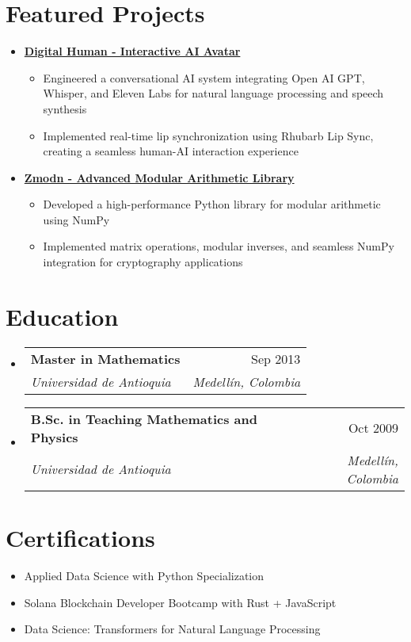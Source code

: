 \documentclass[letterpaper,11pt]{article}
\makeatletter
\newcommand{\resumeSubheading}[4]{
  \vspace{-2pt}
  \item[]
  \begin{tabular*}{\textwidth}{@{\extracolsep{\fill}}l r}
    \textbf{#1} & #2 \\
    \textit{#3} & \textit{#4} \\
  \end{tabular*}
  \vspace{-5pt}
}
\makeatother
\begin{document}
\section{Featured Projects}
\begin{itemize}[leftmargin=*]
    \item \textbf{\href{https://github.com/asanchezyali/talking-avatar-with-ai}{Digital Human - Interactive AI Avatar \faExternalLink}}
    \begin{itemize}
        \item Engineered a conversational AI system integrating Open AI GPT, Whisper, and Eleven Labs for natural language processing and speech synthesis
        \item Implemented real-time lip synchronization using Rhubarb Lip Sync, creating a seamless human-AI interaction experience
    \end{itemize}
    
    \item \textbf{\href{https://github.com/asanchezyali/zmodn}{Zmodn - Advanced Modular Arithmetic Library \faExternalLink}}
    \begin{itemize}
        \item Developed a high-performance Python library for modular arithmetic using NumPy
        \item Implemented matrix operations, modular inverses, and seamless NumPy integration for cryptography applications
    \end{itemize}
\end{itemize}

\section{Education}
\begin{itemize}[leftmargin=0pt, itemindent=0pt, label={}]
\resumeSubheading
{Master in Mathematics}{Sep 2013}
{Universidad de Antioquia}{Medellín, Colombia}

\resumeSubheading
{B.Sc. in Teaching Mathematics and Physics}{Oct 2009}
{Universidad de Antioquia}{Medellín, Colombia}
\end{itemize}

\section{Certifications}
\begin{itemize}[leftmargin=*]
    \item Applied Data Science with Python Specialization
    \item Solana Blockchain Developer Bootcamp with Rust + JavaScript
    \item Data Science: Transformers for Natural Language Processing
\end{itemize}
\end{document}
